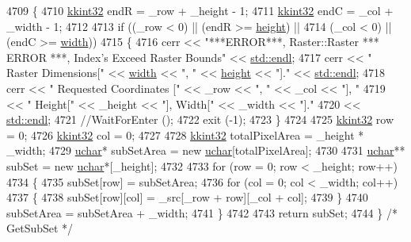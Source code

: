 \begin{DoxyCode}
4709 \{
4710   \hyperlink{namespace_k_k_b_a8fa4952cc84fda1de4bec1fbdd8d5b1b}{kkint32}  endR = \_row + \_height - 1;
4711   \hyperlink{namespace_k_k_b_a8fa4952cc84fda1de4bec1fbdd8d5b1b}{kkint32}  endC = \_col + \_width - 1;
4712 
4713   \textcolor{keywordflow}{if}  ((\_row < 0)  ||  (endR >= \hyperlink{class_k_k_b_1_1_raster_af39ff189de4fbb6de98392e187efafb7}{height}) ||
4714        (\_col < 0)  ||  (endC >= \hyperlink{class_k_k_b_1_1_raster_ae0bcc103e191c3421d7692dc69ceb554}{width}))
4715   \{
4716     cerr << \textcolor{stringliteral}{"***ERROR***, Raster::Raster  *** ERROR ***,  Index's Exceed Raster Bounds"} << 
      \hyperlink{namespace_k_k_b_ad1f50f65af6adc8fa9e6f62d007818a8}{std::endl};
4717     cerr << \textcolor{stringliteral}{"       Raster Dimensions["}       << \hyperlink{class_k_k_b_1_1_raster_ae0bcc103e191c3421d7692dc69ceb554}{width}    << \textcolor{stringliteral}{", "}  << 
      \hyperlink{class_k_k_b_1_1_raster_af39ff189de4fbb6de98392e187efafb7}{height} << \textcolor{stringliteral}{"]."}     << \hyperlink{namespace_k_k_b_ad1f50f65af6adc8fa9e6f62d007818a8}{std::endl};
4718     cerr << \textcolor{stringliteral}{"       Requested Coordinates ["} << \_row     << \textcolor{stringliteral}{", "}  << \_col      << \textcolor{stringliteral}{"], "}
4719          << \textcolor{stringliteral}{"       Height["}  << \_height << \textcolor{stringliteral}{"],  Width["} << \_width << \textcolor{stringliteral}{"]."}
4720          << \hyperlink{namespace_k_k_b_ad1f50f65af6adc8fa9e6f62d007818a8}{std::endl};
4721     \textcolor{comment}{//WaitForEnter ();}
4722     exit (-1);
4723   \}
4724 
4725   \hyperlink{namespace_k_k_b_a8fa4952cc84fda1de4bec1fbdd8d5b1b}{kkint32}  row = 0;
4726   \hyperlink{namespace_k_k_b_a8fa4952cc84fda1de4bec1fbdd8d5b1b}{kkint32}  col = 0;
4727 
4728   \hyperlink{namespace_k_k_b_a8fa4952cc84fda1de4bec1fbdd8d5b1b}{kkint32}  totalPixelArea = \_height * \_width;
4729   \hyperlink{namespace_k_k_b_ace9969169bf514f9ee6185186949cdf7}{uchar}* subSetArea = \textcolor{keyword}{new} \hyperlink{namespace_k_k_b_ace9969169bf514f9ee6185186949cdf7}{uchar}[totalPixelArea];
4730 
4731   \hyperlink{namespace_k_k_b_ace9969169bf514f9ee6185186949cdf7}{uchar}** subSet = \textcolor{keyword}{new} \hyperlink{namespace_k_k_b_ace9969169bf514f9ee6185186949cdf7}{uchar}*[\_height];
4732   
4733   \textcolor{keywordflow}{for}  (row = 0; row < \_height; row++)
4734   \{
4735     subSet[row] = subSetArea;
4736     \textcolor{keywordflow}{for}  (col = 0; col < \_width; col++)
4737     \{
4738       subSet[row][col] = \_src[\_row + row][\_col + col];
4739     \}
4740     subSetArea = subSetArea + \_width;
4741   \}
4742 
4743   \textcolor{keywordflow}{return}  subSet;
4744 \}  \textcolor{comment}{/* GetSubSet */}
\end{DoxyCode}
